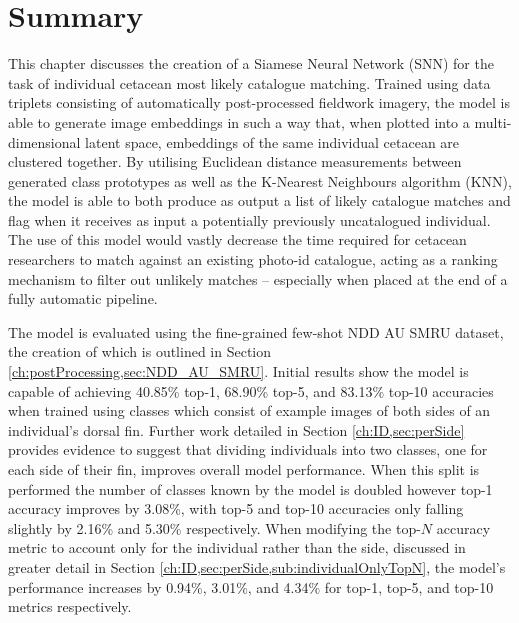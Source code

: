 \section{Summary}\label{ch:ID,sec:Summary}

This chapter discusses the creation of a Siamese Neural Network (SNN) for the task of individual cetacean most likely catalogue matching. Trained using data triplets consisting of automatically post-processed fieldwork imagery, the model is able to generate image embeddings in such a way that, when plotted into a multi-dimensional latent space, embeddings of the same individual cetacean are clustered together. By utilising Euclidean distance measurements between generated class prototypes as well as the K-Nearest Neighbours algorithm (KNN), the model is able to both produce as output a list of likely catalogue matches and flag when it receives as input a potentially previously uncatalogued individual. The use of this model would vastly decrease the time required for cetacean researchers to match against an existing photo-id catalogue, acting as a ranking mechanism to filter out unlikely matches -- especially when placed at the end of a fully automatic pipeline.

The model is evaluated using the fine-grained few-shot NDD AU SMRU dataset, the creation of which is outlined in Section \ref{ch:postProcessing,sec:NDD_AU_SMRU}. Initial results show the model is capable of achieving 40.85\% top-1, 68.90\% top-5, and 83.13\% top-10 accuracies when trained using classes which consist of example images of both sides of an individual's dorsal fin. Further work detailed in Section \ref{ch:ID,sec:perSide} provides evidence to suggest that dividing individuals into two classes, one for each side of their fin, improves overall model performance. When this split is performed the number of classes known by the model is doubled however top-1 accuracy improves by 3.08\%, with top-5 and top-10 accuracies only falling slightly by 2.16\% and 5.30\% respectively. When modifying the top-$N$ accuracy metric to account only for the individual rather than the side, discussed in greater detail in Section \ref{ch:ID,sec:perSide,sub:individualOnlyTopN}, the model's performance increases by 0.94\%, 3.01\%, and 4.34\% for top-1, top-5, and top-10 metrics respectively. 

